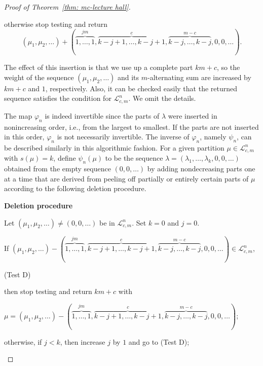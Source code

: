 \documentclass[11pt,reqno]{amsart}
\numberwithin{equation}{section}
\theoremstyle{plain}
\theoremstyle{definition}
\newcommand{\LL}{\mathcal{L}}
\begin{document}
\begin{proof}[Proof of Theorem~\ref{thm: mc-lecture hall}]
\begin{framed}
otherwise stop testing and return
$$(\mu_1,\mu_2,\ldots)+(\overbrace{1,\ldots,1}^{jm},\overbrace{k-j+1,\ldots,k-j+1}^{c},\overbrace{k-j,\ldots,k-j}^{m-c},0,0,\ldots).$$


\end{framed}

The effect of this insertion is that we use up a complete part $km+c$, so the weight of the sequence $(\mu_1,\mu_2,\ldots)$ and its $m$-alternating sum are increased by $km+c$ and $1$, respectively. Also, it can be checked easily that the returned sequence satisfies the condition for $\LL_{c,m}^n$. We omit the details.

The map $\varphi_n$ is indeed invertible since the parts of $\lambda$ were inserted in nonincreasing order, i.e., from the largest to smallest.  If the parts are not inserted in this order, $\varphi_n$ is not necessarily invertible.  The inverse of $\varphi_n$, namely $\psi_n$, can be described similarly in this algorithmic fashion. For a given partition $\mu\in\LL_{c,m}^n$ with $s(\mu)=k$, define $\psi_n(\mu)$ to be the sequence $\lambda=(\lambda_1,\ldots,\lambda_k,0,0,\ldots)$ obtained from the empty sequence $(0,0,\ldots)$ by adding nondecreasing parts one at a time that are derived from peeling off partially or entirely certain parts of $\mu$ according to the following deletion procedure.

\begin{framed}
\begin{center}
{\bf Deletion procedure}
\end{center}




\noindent Let $(\mu_1,\mu_2,\ldots)\neq (0,0,\ldots)$ be in $\LL_{c,m}^n$. Set $k=0$ and $j=0$. \hfill







If $(\mu_1,\mu_2,\ldots)-(\overbrace{1,\ldots,1}^{jm},\overbrace{k-j+1,\ldots,k-j+1}^{c},\overbrace{k-j,\ldots,k-j}^{m-c},0,0,\ldots) \in\LL_{c,m}^n$,

 (Test D)

\hskip 0.2in  then stop testing and return $km+c$ with \hfill

\qquad \qquad   $\mu=(\mu_1,\mu_2,\ldots)-(\overbrace{1,\ldots,1}^{jm},\overbrace{k-j+1,\ldots, k-j+1}^{c},\overbrace{k-j,\ldots, k-j}^{m-c},0,0,\ldots)$; \hfill

otherwise,  if  $j<k$, then increase $j$ by $1$ and  go to (Test D); \hfill


\end{framed}
\end{proof}
\end{document}
